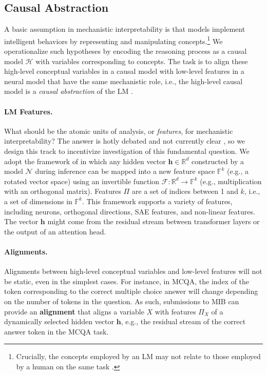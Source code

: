 \documentclass{article}
\theoremstyle{plain}
\theoremstyle{definition}
\theoremstyle{remark}
\newcommand{\mib}{\textsf{MIB}}
\begin{document}
\subsection{Causal Abstraction }
A basic assumption in mechanistic interpretability is that models implement intelligent behaviors by representing and manipulating concepts.\footnote{Crucially, the concepts employed by an LM may not relate to those employed by a human on the same task \citep{hewitt2025cantunderstandaiusing}.}
We operationalize such hypotheses by encoding the reasoning process as a causal model $\mathcal{H}$ with variables corresponding to concepts. The task is to align these high-level conceptual variables in a causal model with low-level features in a neural model that have the same mechanistic role, i.e., the high-level causal model is a \textit{causal abstraction} of the LM \cite{geiger2021, geiger2024causalabstractiontheoreticalfoundation}.

\paragraph{LM Features.} What should be the atomic units of analysis, or \textit{features}, for mechanistic interpretability? The answer is hotly debated and not currently clear \citep{mueller2024questrightmediatorhistory}, so we design this track to incentivize investigation of this fundamental question. We adopt the framework of \citet{geiger2024causalabstractiontheoreticalfoundation} in which any hidden vector $\mathbf{h} \in \mathbb{R}^d$ constructed by a model $\mathcal{N}$ during inference can be mapped into a new feature space $\mathbb{F}^k$ (e.g., a rotated vector space) using an invertible function $\mathcal{F}: \mathbb{R}^d \to \mathbb{F}^k$ (e.g., multiplication with an orthogonal matrix).
Features $\Pi$ are a set of indices between 1 and $k$, i.e., a set of dimensions in $\mathbb{F}^k$. 
This framework supports a variety of features, including neurons, orthogonal directions, SAE features, and non-linear features. The vector $\mathbf{h}$ might come from the residual stream between transformer layers or the output of an attention head.

\paragraph{Alignments.}
Alignments between high-level conceptual variables and low-level features will not be static, even in the simplest cases. For instance, in MCQA, the index of the token corresponding to the correct multiple choice answer will change depending on the number of tokens in the question. As such, submissions to \mib{} can provide an \textbf{alignment} that aligns a variable $X$ with features $\Pi_X$ of a dynamically selected hidden vector $\mathbf{h}$, e.g., the residual stream of the correct answer token in the MCQA task.
\end{document}
